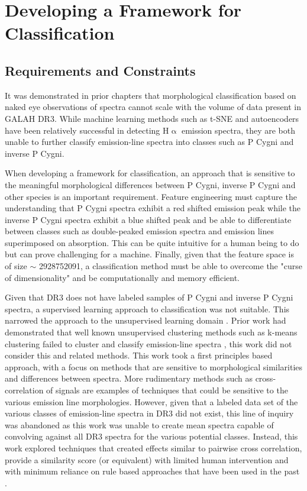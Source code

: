 \chapter{Developing a Framework for Classification}

\section{Requirements and Constraints}

It was demonstrated in prior chapters that morphological classification based on naked eye observations of spectra cannot scale with the volume of data present in GALAH DR3. While machine learning methods such as t-SNE and autoencoders \cite{traven2017galah}\cite{vcotar2021galah} have been relatively successful in detecting H$\upalpha$ emission spectra, they are both unable to further classify emission-line spectra into classes such as P Cygni and inverse P Cygni.

When developing a framework for classification, an approach that is sensitive to the meaningful morphological differences between P Cygni, inverse P Cygni and other species is an important requirement. Feature engineering must capture the understanding that P Cygni spectra exhibit a red shifted emission peak while the inverse P Cygni spectra exhibit a blue shifted peak and be able to differentiate between classes such as double-peaked emission spectra and emission lines superimposed on absorption. This can be quite intuitive for a human being to do but can prove challenging for a machine. Finally, given that the feature space is of size $\sim$ \num[round-precision=2,round-mode=figures, scientific-notation=true]{2928752091}, a classification method must be able to overcome the "curse of dimensionality" and be computationally and memory efficient.

Given that DR3 does not have labeled samples of P Cygni and inverse P Cygni spectra, a supervised learning approach to classification was not suitable. This narrowed the approach to the unsupervised learning domain \cite{hastie2009elements}. Prior work had demonstrated that well known unsupervised clustering methods such as k-means clustering failed to cluster and classify emission-line spectra \cite{garcia2018machine}, this work did not consider this and related methods. This work took a first principles based approach, with a focus on methods that are sensitive to morphological similarities and differences between spectra. More rudimentary methods such as cross-correlation of signals are examples of techniques that could be sensitive to the various emission line morphologies. However, given that a labeled data set of the various classes of emission-line spectra in DR3 did not exist, this line of inquiry was abandoned as this work was unable to create mean spectra capable of convolving against all DR3 spectra for the various potential classes. Instead, this work explored techniques that created effects similar to pairwise cross correlation, provide a similarity score (or equivalent) with limited human intervention and with minimum reliance on rule based approaches that have been used in the past \cite{traven2015gaia}. 


